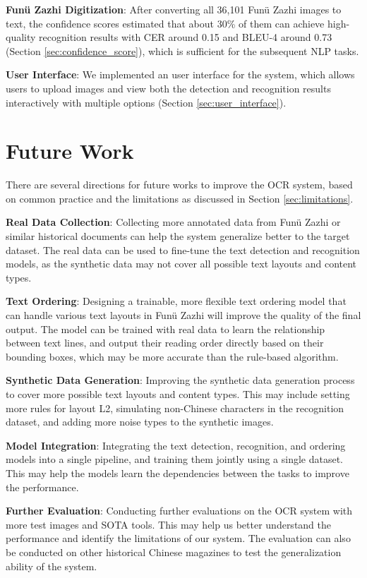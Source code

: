 \documentclass[12pt,twoside]{report}
\begin{document}
\textbf{Funü Zazhi Digitization}: After converting all 36,101 Funü Zazhi images to text, the confidence scores estimated that about 30\% of them can achieve high-quality recognition results with CER around 0.15 and BLEU-4 around 0.73 (Section \ref{sec:confidence_score}), which is sufficient for the subsequent NLP tasks.

\textbf{User Interface}: We implemented an user interface for the system, which allows users to upload images and view both the detection and recognition results interactively with multiple options (Section \ref{sec:user_interface}).

\section{Future Work}
\label{sec:future_work}
There are several directions for future works to improve the OCR system, based on common practice and the limitations as discussed in Section \ref{sec:limitations}.

\textbf{Real Data Collection}: Collecting more annotated data from Funü Zazhi or similar historical documents can help the system generalize better to the target dataset. The real data can be used to fine-tune the text detection and recognition models, as the synthetic data may not cover all possible text layouts and content types.

\textbf{Text Ordering}: Designing a trainable, more flexible text ordering model that can handle various text layouts in Funü Zazhi will improve the quality of the final output. The model can be trained with real data to learn the relationship between text lines, and output their reading order directly based on their bounding boxes, which may be more accurate than the rule-based algorithm.

\textbf{Synthetic Data Generation}: Improving the synthetic data generation process to cover more possible text layouts and content types. This may include setting more rules for layout L2, simulating non-Chinese characters in the recognition dataset, and adding more noise types to the synthetic images.

\textbf{Model Integration}: Integrating the text detection, recognition, and ordering models into a single pipeline, and training them jointly using a single dataset. This may help the models learn the dependencies between the tasks to improve the performance.

\textbf{Further Evaluation}: Conducting further evaluations on the OCR system with more test images and SOTA tools. This may help us better understand the performance and identify the limitations of our system. The evaluation can also be conducted on other historical Chinese magazines to test the generalization ability of the system.
\end{document}

